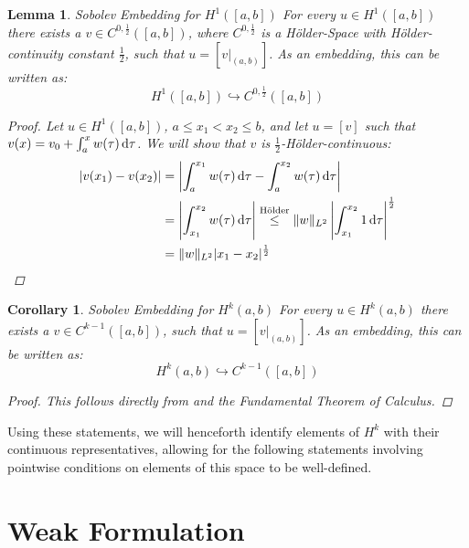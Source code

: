 \documentclass[headsepline,footsepline,footinclude=false,oneside,fontsize=11pt,paper=a4,listof=totoc,bibliography=totoc]{scrbook} %
\newtheorem{lemma}{Lemma}
\newtheorem{corollary}{Corollary}
\begin{document}
\begin{lemma} Sobolev Embedding for $H^1([a,b])$ \newline
	For every $u \in H^1([a,b])$ there exists a $v \in C^{0,\frac{1}{2}}([a,b])$, where $C^{0,\frac{1}{2}}$ is a Hölder-Space with Hölder-continuity constant $\frac{1}{2}$, such that $u = [v \vert_{(a,b)}]$. As an embedding, this can be written as:
	\begin{equation} \label{eq:sobolev1_embedding}
	H^1([a,b]) \hookrightarrow C^{0,\frac{1}{2}}([a,b])
	\end{equation}
	\begin{proof}
	Let $u \in H^1([a,b])$, $a \leq x_1 < x_2 \leq b$, and let $u = [v]$ such that $v(x) = v_0 + \int_a^x w(\tau) \dif \tau$. We will show that $v$ is $\frac{1}{2}$-Hölder-continuous:
	\begin{align*}
	\vert v(x_1) - v(x_2) \vert &= \left\vert \int_{a}^{x_1} w(\tau) \dif \tau - \int_{a}^{x_2} w(\tau) \dif \tau \right\vert \\
	&= \left\vert \int_{x_1}^{x_2} w(\tau) \dif \tau \right\vert \overset{\textnormal{Hölder}}{\leq} \Vert w \Vert_{L^2} \left\vert \int_{x_1}^{x_2} 1 \dif \tau \right\vert ^{\frac{1}{2}} \\
	& = \Vert w \Vert_{L^2} \vert x_1 - x_2 \vert ^{\frac{1}{2}}
	\end{align*}
	\end{proof}
\end{lemma}

\begin{corollary} Sobolev Embedding for $H^k(a,b)$ \newline
		For every $u \in H^k(a,b)$ there exists a $v \in C^{k-1}([a,b])$, such that $u = [v \vert_{(a,b)}]$. As an embedding, this can be written as:
	\begin{equation}
	H^k(a,b) \hookrightarrow C^{k-1}([a,b])
	\end{equation}
	\begin{proof}
		This follows directly from  and the Fundamental Theorem of Calculus.
	\end{proof}
\end{corollary}
	

Using these statements, we will henceforth identify elements of $H^k$ with their continuous representatives, allowing for the following statements involving pointwise conditions on elements of this space to be well-defined.

\section{Weak Formulation}
\end{document}
